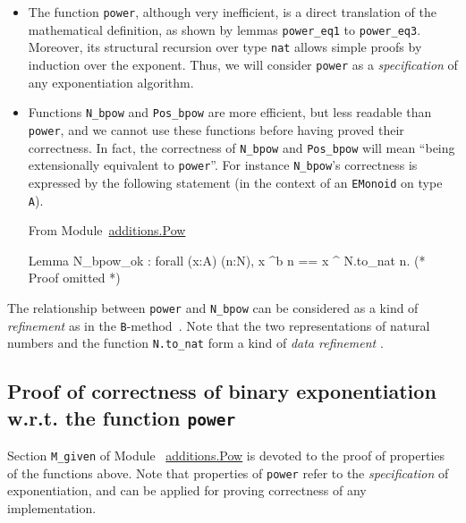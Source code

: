 \begin{itemize}
\item The function \texttt{power}, although very inefficient, is a direct 
translation of the mathematical definition, as shown by  lemmas \texttt{power\_eq1} to \linebreak \texttt{power\_eq3}. Moreover, its structural recursion over type \texttt{nat} allows simple proofs by induction over the exponent. 
Thus, we will consider \texttt{power} as a \emph{specification} of any exponentiation algorithm.

\item Functions \texttt{N\_bpow} and \texttt{Pos\_bpow} are more efficient, but less readable than \texttt{power}, and we cannot use these functions before 
having proved their correctness. In fact, the correctness of 
\texttt{N\_bpow} and \texttt{Pos\_bpow} will mean ``being extensionally equivalent to \texttt{power}''.
For instance \texttt{N\_bpow}'s correctness is expressed by the following
statement (in the context of an \texttt{EMonoid} on type \texttt{A}).


\vspace{4pt}
From Module~\href{../theories/html/hydras.additions.Pow.html}{additions.Pow}

\begin{Coqsrc}
Lemma N_bpow_ok : 
forall (x:A) (n:N),   x ^b n  == x ^ N.to_nat n.
(* Proof omitted *)
\end{Coqsrc}

\end{itemize}


The relationship between \texttt{power} and \texttt{N\_bpow} can be considered
as a kind of \emph{refinement} as in the \texttt{B}-method~\cite{b-book}. Note
that the two representations of natural numbers and the function \texttt{N.to\_nat}
form a kind of  \emph{data refinement} \cite{Abrial:2010:MES:1855020, cohen:hal-01113453}.



\subsection{Proof of correctness of binary exponentiation w.r.t. the function \texttt{power}}
Section \texttt{M\_given} of Module 
~\href{../theories/html/hydras.additions.Pow.html}{additions.Pow} is devoted to the proof 
of properties of the functions above.
Note that properties of \texttt{power} refer to the \emph{specification} of exponentiation, and can be applied for proving correctness of any implementation.

